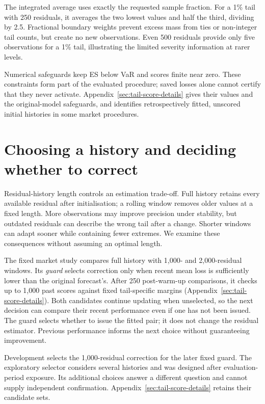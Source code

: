 The integrated average uses exactly the requested sample fraction. For a 1\% tail with 250 residuals, it averages the two lowest values and half the third, dividing by 2.5. Fractional boundary weights prevent excess mass from ties or non-integer tail counts, but create no new observations. Even 500 residuals provide only five observations for a 1\% tail, illustrating the limited severity information at rarer levels.

Numerical safeguards keep ES below VaR and scores finite near zero. These constraints form part of the evaluated procedure; saved losses alone cannot certify that they never activate. Appendix~\ref{sec:tail-score-details} gives their values and the original-model safeguards, and identifies retrospectively fitted, unscored initial histories in some market procedures.

\section{Choosing a history and deciding whether to correct}

Residual-history length controls an estimation trade-off. Full history retains every available residual after initialisation; a rolling window removes older values at a fixed length. More observations may improve precision under stability, but outdated residuals can describe the wrong tail after a change. Shorter windows can adapt sooner while containing fewer extremes. We examine these consequences without assuming an optimal length.

The fixed market study compares full history with 1,000- and 2,000-residual windows. Its \emph{guard} selects correction only when recent mean loss is sufficiently lower than the original forecast's. After 250 post-warm-up comparisons, it checks up to 1,000 past scores against fixed tail-specific margins (Appendix~\ref{sec:tail-score-details}). Both candidates continue updating when unselected, so the next decision can compare their recent performance even if one has not been issued. The guard selects whether to issue the fitted pair; it does not change the residual estimator. Previous performance informs the next choice without guaranteeing improvement.

Development selects the 1,000-residual correction for the later fixed guard. The exploratory selector considers several histories and was designed after evaluation-period exposure. Its additional choices answer a different question and cannot supply independent confirmation. Appendix~\ref{sec:tail-score-details} retains their candidate sets.


